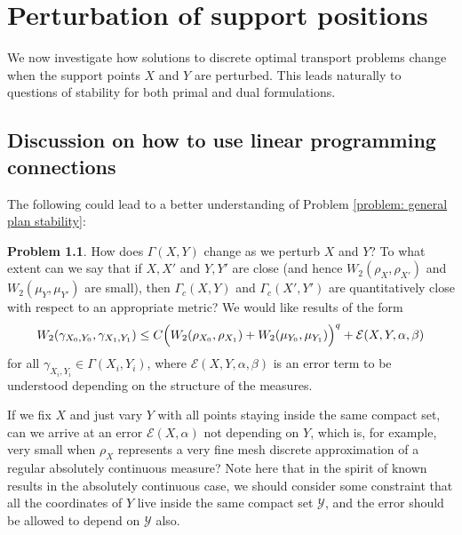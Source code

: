 \documentclass[11pt, oneside, titlepage]{book}
\theoremstyle{plain}
\theoremstyle{definition}
\newtheorem{problem}{Problem}
\newcommand{\Y}{\mathcal{Y}}
\newcommand{\E}{\mathcal{E}}
\begin{document}
\chapter{Perturbation of support positions}
\label{ch: pertubations}


We now investigate how solutions to discrete optimal transport problems change when the support points $X$ and $Y$ are perturbed. This leads naturally to questions of stability for both primal and dual formulations.

\section{Discussion on how to use linear programming connections}

The following could lead to a better understanding of Problem \ref{problem: general plan stability}:


\begin{problem}
\label{problem: discrete plan stability}
    How does $\Gamma(X, Y)$ change as we perturb $X$ and $Y$? To what extent can we say that if $X, X'$ and $Y, Y'$ are close (and hence $W_2(\rho_X, \rho_{X'})$ and $W_2(\mu_Y, \mu_{Y'})$ are small), then $\Gamma_c(X, Y)$ and $\Gamma_c(X', Y')$ are quantitatively close with respect to an appropriate metric? We would like results of the form
\begin{equation}
\label{eq: stability of plans discrete goal statement}
    W_2(\gamma_{X_0,Y_0}, \gamma_{X_1, Y_1}) \leq C \Bigl(W_2(\rho_{X_0}, \rho_{X_1}) + W_2(\mu_{Y_0}, \mu_{Y_1}) \Bigr)^q + \mathcal{E}(X, Y, \alpha, \beta)
\end{equation}
for all $\gamma_{X_i, Y_i} \in \Gamma(X_i, Y_i)$, where $\mathcal{E}(X, Y, \alpha, \beta)$ is an error term to be understood depending on the structure of the measures.

If we fix $X$ and just vary $Y$ with all points staying inside the same compact set, can we arrive at an error $\E(X, \alpha)$ not depending on $Y$, which is, for example, very small when $\rho_X$ represents a very fine mesh discrete approximation of a regular absolutely continuous measure? Note here that in the spirit of known results in the absolutely continuous case, we should consider some constraint that all the coordinates of $Y$ live inside the same compact set $\Y$, and the error should be allowed to depend on $\Y$ also.\end{problem}
\end{document}
